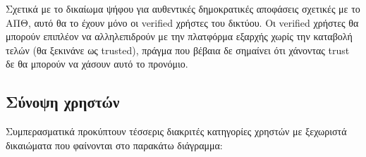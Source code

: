 Σχετικά με το δικαίωμα ψήφου για αυθεντικές δημοκρατικές αποφάσεις σχετικές με το ΑΠΘ, αυτό θα το έχουν μόνο οι verified χρήστες του δικτύου. Οι verified χρήστες θα μπορούν επιπλέον να αλληλεπιδρούν με την πλατφόρμα εξαρχής χωρίς την καταβολή τελών (θα ξεκινάνε ως trusted), πράγμα που βέβαια δε σημαίνει ότι χάνοντας trust δε θα μπορούν να χάσουν αυτό το προνόμιο.

\subsection{Σύνοψη χρηστών}

Συμπερασματικά προκύπτουν τέσσερις διακριτές κατηγορίες χρηστών με ξεχωριστά δικαιώματα που φαίνονται στο παρακάτω διάγραμμα:

